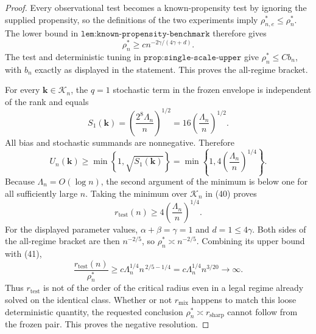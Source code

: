 \documentclass{article}
\begin{document}
\begin{proof}
Every observational test becomes a known-propensity test by ignoring the supplied propensity, so the definitions of the two experiments imply \(\rho_{n,e}^*\le\rho_n^*\). The lower bound in \(\texttt{lem:known-propensity-benchmark}\) therefore gives
\[
 \rho_n^*\ge c n^{-2\gamma/(4\gamma+d)}.                              \tag{38}
\]
The test and deterministic tuning in \(\texttt{prop:single-scale-upper}\) give \(\rho_n^*\le Cb_n\), with \(b_n\) exactly as displayed in the statement. This proves the all-regime bracket.

For every \(\mathbf k\in\mathcal K_n\), the \(q=1\) stochastic term in the frozen envelope is independent of the rank and equals
\[
 S_1(\mathbf k)
 =\left(\frac{2^8\Lambda_n}{n}\right)^{1/2}
 =16\left(\frac{\Lambda_n}{n}\right)^{1/2}.                          \tag{39}
\]
All bias and stochastic summands are nonnegative. Therefore
\[
 U_n(\mathbf k)
 \ge\min\left\{1,\sqrt{S_1(\mathbf k)}\right\}
 =\min\left\{1,4\left(\frac{\Lambda_n}{n}\right)^{1/4}\right\}.       \tag{40}
\]
Because \(\Lambda_n=O(\log n)\), the second argument of the minimum is below one for all sufficiently large \(n\). Taking the minimum over \(\mathcal K_n\) in (40) proves
\[
 r_{\mathrm{test}}(n)\ge4\left(\frac{\Lambda_n}{n}\right)^{1/4}.     \tag{41}
\]
For the displayed parameter values, \(\alpha+\beta=\gamma=1\) and \(d=1\le4\gamma\). Both sides of the all-regime bracket are then \(n^{-2/5}\), so \(\rho_n^*\asymp n^{-2/5}\). Combining its upper bound with (41),
\[
 \frac{r_{\mathrm{test}}(n)}{\rho_n^*}
 \ge c\Lambda_n^{1/4}n^{\,2/5-1/4}
 =c\Lambda_n^{1/4}n^{3/20}\longrightarrow\infty.                    \tag{42}
\]
Thus \(r_{\mathrm{test}}\) is not of the order of the critical radius even in a legal regime already solved on the identical class. Whether or not \(r_{\mathrm{mix}}\) happens to match this loose deterministic quantity, the requested conclusion \(\rho_n^*\asymp r_{\mathrm{sharp}}\) cannot follow from the frozen pair. This proves the negative resolution.
\end{proof}
\end{document}

